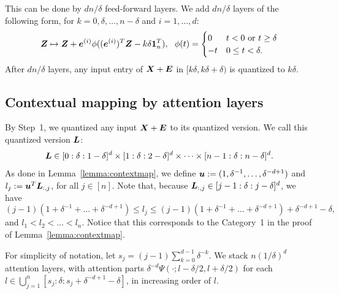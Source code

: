 This can be done by $dn/\delta$ feed-forward layers.
We add $dn/\delta$ layers of the following form, for $k = 0, \delta, \dots, n-\delta$ and $i = 1, \dots, d$:
\begin{equation*}
    {\bm{Z}} \mapsto {\bm{Z}} + {\bm{e}}^{(i)} \phi( ({\bm{e}}^{(i)})^T {\bm{Z}} - k\delta {\bm{1}}_n^T),
    ~~
    \phi(t) = 
    \begin{cases}
    0 & t < 0 \text{ or } t \geq \delta\\
    -t & 0 \leq t < \delta.
    \end{cases}
\end{equation*}
After $dn/\delta$ layers, any input entry of ${\bm{X}} + {\bm{E}}$ in $[k\delta, k\delta+\delta)$ is quantized to $k\delta$.


\subsection{Contextual mapping by attention layers}
By Step~1, we quantized any input ${\bm{X}} + {\bm{E}}$ to its quantized version. We call this quantized version ${\bm{L}}$:
\begin{equation*}
{\bm{L}} \in [0:\delta:1-\delta]^d \times [1:\delta:2-\delta]^d \times \dots \times [n-1:\delta:n-\delta]^d.
\end{equation*}
As done in Lemma~\ref{lemma:contextmap}, we define ${\bm{u}} := (1, \delta^{-1}, \dots, \delta^{-d+1})$ and $l_j := {\bm{u}}^T {\bm{L}}_{:,j}$, for all $j \in [n]$.
Note that, because ${\bm{L}}_{:,j} \in [j-1:\delta:j-\delta]^d$, we have
\begin{equation*}
    (j-1)(1+\delta^{-1}+\dots+\delta^{-d+1}) \leq l_j \leq (j-1)(1+\delta^{-1}+\dots+\delta^{-d+1}) + \delta^{-d+1} - \delta,
\end{equation*}
and $l_1 < l_2 < \dots < l_n$. Notice that this corresponds to the Category~1 in the proof of Lemma~\ref{lemma:contextmap}.

For simplicity of notation, let $s_j = (j-1) \sum_{k=0}^{d-1} \delta^{-k}$.
We stack $n(1/\delta)^d$ attention layers, with attention parts $\delta^{-d} \Psi(\cdot;l-\delta/2,l+\delta/2)$ for each $l \in \bigcup_{j=1}^n [s_j :\delta: s_j + \delta^{-d+1} - \delta]$, in increasing order of $l$.

